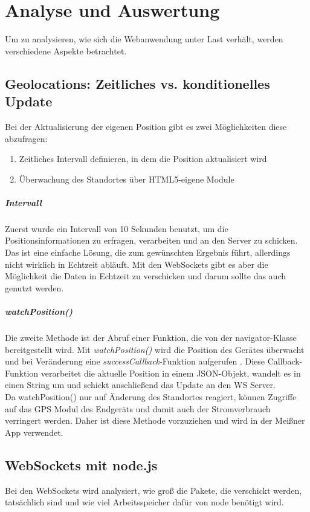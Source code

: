 \chapter{Analyse und Auswertung}
Um zu analysieren, wie sich die Webanwendung unter Last verhält, werden verschiedene Aspekte betrachtet.

\section{Geolocations: Zeitliches vs. konditionelles Update}
Bei der Aktualisierung der eigenen Position gibt es zwei Möglichkeiten diese abzufragen:

\begin{enumerate}
	\item Zeitliches Intervall definieren, in dem die Position aktualisiert wird
	\item Überwachung des Standortes über HTML5-eigene Module
\end{enumerate}

\paragraph{Intervall}
Zuerst wurde ein Intervall von 10 Sekunden benutzt, um die Positionsinformationen zu erfragen, verarbeiten und an den Server zu schicken. Das ist eine einfache Lösung, die zum gewünschten Ergebnis führt, allerdings nicht wirklich in Echtzeit abläuft. Mit den WebSockets gibt es aber die Möglichkeit die Daten in Echtzeit zu verschicken und darum sollte das auch genutzt werden.

\paragraph{watchPosition()}
Die zweite Methode ist der Abruf einer Funktion, die von der navigator-Klasse bereitgestellt wird. Mit \emph{watchPosition()} wird die Position des Gerätes überwacht und bei Veränderung eine \emph{successCallback}-Funktion aufgerufen \cite{geolocationapi}. Diese Callback-Funktion verarbeitet die aktuelle Position in einem JSON-Objekt, wandelt es in einen String um und schickt anschließend das Update an den WS Server.\\
Da watchPosition() nur auf Änderung des Standortes reagiert, können Zugriffe auf das GPS Modul des Endgeräts und damit auch der Stromverbrauch verringert werden. Daher ist diese Methode vorzuziehen und wird in der Meißner App verwendet.

\section{WebSockets mit node.js}
Bei den WebSockets wird analysiert, wie groß die Pakete, die verschickt werden, tatsächlich sind und wie viel Arbeitsspeicher dafür von node benötigt wird.

